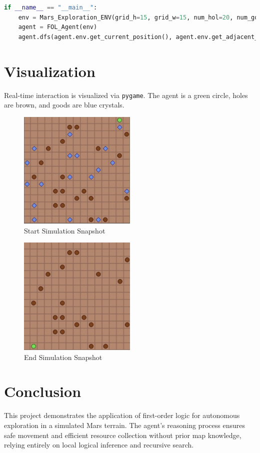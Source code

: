 \documentclass[12pt]{article}
\begin{document}
\begin{lstlisting}[language=Python, caption=Main Agent Execution]
if __name__ == "__main__":
    env = Mars_Exploration_ENV(grid_h=15, grid_w=15, num_hol=20, num_good=20)
    agent = FOL_Agent(env)
    agent.dfs(agent.env.get_current_position(), agent.env.get_adjacent_blocks())
\end{lstlisting}

\section{Visualization}

Real-time interaction is visualized via \texttt{pygame}. The agent is a green circle, holes are brown, and goods are blue crystals.

\begin{figure}[h]
\centering
\includegraphics[width=0.5\textwidth]{start.png}
\caption{Start Simulation Snapshot}
\end{figure}

\begin{figure}[h]
\centering
\includegraphics[width=0.5\textwidth]{end.png}
\caption{End Simulation Snapshot}
\end{figure}
\section{Conclusion}

This project demonstrates the application of first-order logic for autonomous exploration in a simulated Mars terrain. The agent's reasoning process ensures safe movement and efficient resource collection without prior map knowledge, relying entirely on local logical inference and recursive search.
\end{document}
